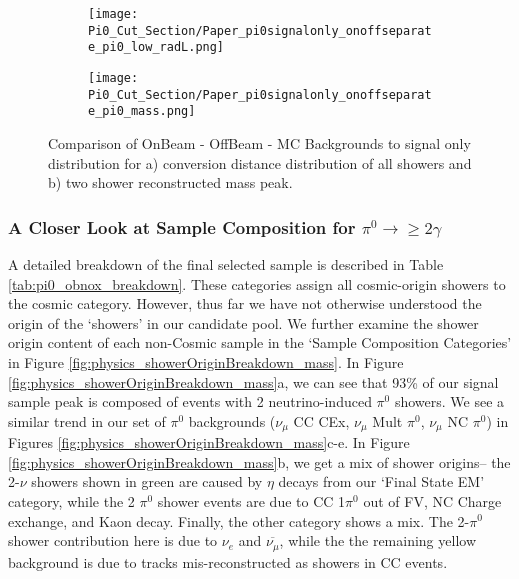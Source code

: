 \begin{figure}[h!]
\centering
  \begin{subfigure}[t]{0.3\textwidth}
    \centering
\texttt{[image: Pi0\_Cut\_Section/Paper\_pi0signalonly\_onoffseparate\_pi0\_low\_radL.png]}
  \caption{ }
  \end{subfigure} 
  \hspace{30mm}
  \begin{subfigure}[t]{0.3\textwidth}
    \centering
\texttt{[image: Pi0\_Cut\_Section/Paper\_pi0signalonly\_onoffseparate\_pi0\_mass.png]}
  \caption{ }
  \end{subfigure} 

\caption{ Comparison of OnBeam - OffBeam - MC Backgrounds to signal only distribution for a) conversion distance distribution of all showers and b) two shower reconstructed mass peak.  }
\label{fig:physics_pi0signalonly_mass} 
\end{figure}


\clearpage
\subsubsection{A Closer Look at Sample Composition for $\pi^0\rightarrow\geq 2 \gamma$}
A detailed breakdown of the final selected sample is described in Table \ref{tab:pi0_obnox_breakdown}.  These categories assign all cosmic-origin showers to the cosmic category.  However, thus far we have not otherwise understood the origin of the `showers' in our candidate pool.  We further examine the shower origin content of each non-Cosmic sample in the `Sample Composition Categories' in Figure \ref{fig:physics_showerOriginBreakdown_mass}.  In Figure \ref{fig:physics_showerOriginBreakdown_mass}a, we can see that 93\% of our signal sample peak is composed of events with 2 neutrino-induced $\pi^0$ showers. We see a similar trend in our set of $\pi^0$ backgrounds ($\nu_\mu$ CC CEx, $\nu_\mu$ Mult $\pi^0$, $\nu_\mu$ NC $\pi^0$) in Figures \ref{fig:physics_showerOriginBreakdown_mass}c-e.  In Figure \ref{fig:physics_showerOriginBreakdown_mass}b, we get a mix of shower origins-- the 2-$\nu$ showers shown in green are caused by $\eta$ decays from our `Final State EM' category, while the 2 $\pi^0$ shower events are due to CC 1$\pi^0$ out of FV, NC Charge exchange, and Kaon decay. Finally, the other category shows a mix.  The 2-$\pi^0$ shower contribution here is due to $\nu_e$ and $\overline{\nu_\mu}$, while the the remaining yellow background is due to tracks mis-reconstructed as showers in CC events.

